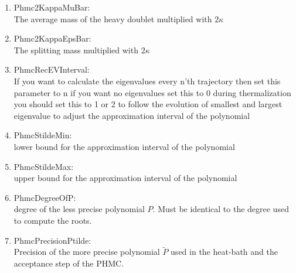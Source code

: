 \begin{enumerate}
\item {\ttfamily Phmc2KappaMuBar}:\\
  The average mass of the heavy doublet multiplied with $2\kappa$

\item {\ttfamily Phmc2KappaEpsBar}:\\
  The splitting mass multiplied with $2\kappa$


\item {\ttfamily PhmcRecEVInterval}:\\
  If you want to calculate the eigenvalues every n'th trajectory
  then set this parameter to n if you want no eigenvalues set this to 0
  during thermalization you should set this to 1 or 2 to follow the evolution
  of smallest and largest eigenvalue to adjust the approximation interval
  of the polynomial

\item {\ttfamily PhmcStildeMin}:\\
  lower bound for the approximation interval of the polynomial

\item {\ttfamily PhmcStildeMax}:\\
  upper bound for the approximation interval of the polynomial

\item {\ttfamily PhmcDegreeOfP}:\\
  degree of the less precise polynomial $P$. Must be identical to the
  degree used to compute the roots.

\item {\ttfamily PhmcPrecisionPtilde}:\\
  Precision of the more precise polynomial $\tilde P$ used in the
  heat-bath and the acceptance step of the PHMC.


\end{enumerate}

